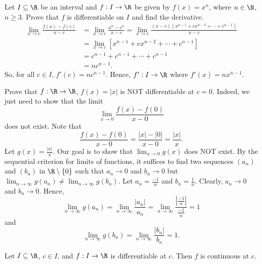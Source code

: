 \begin{eg}
    Let \( I \subseteq  \R  \) be an interval and \( f: I \to \R  \) be given by \( f(x) = x^{n} \), where \( n \in \N  \), \( n \geq 3  \). Prove that \( f  \) is differentiable on \( I  \) and find the derivative.   
    \begin{align*}
        \lim_{ x \to c  }  \frac{ f(x) - f(c) }{ x - c  }  &= \lim_{ x \to c  }  \frac{ x^{n} - c^{n}  }{  x - c  }  = \lim_{ x \to c  }  \frac{ (x - c ) (x^{n-1} + c x^{n-2 } + \cdots + c^{n-1}) }{  x  -c  }  \\
                                                           &= \lim_{ x \to c  }  [x^{n-1} + c x^{n-2 } + \cdots  + c^{n-1} ] \\
                                                           &= c^{n-1 } + c^{n-1} + \cdots + c^{n-1} \\
                                                           &= n c^{n-1}.
    \end{align*}
    So, for all \( c \in I  \), \( f'(c) = n c^{n-1} \). Hence, \( f': I \to \R  \) where \( f'(x) = n x^{n-1 } \).
\end{eg}

\begin{eg}
Prove that \( f: \R \to \R  \), \( f(x) = | x  |  \) is NOT differentiable at \( c = 0  \). Indeed, we just need to show that the limit
\[  \lim_{ x \to 0  }  \frac{ f(x) - f(0) }{ x - 0  }   \]
does not exist. Note that 
\[  \frac{ f(x) - f(0) }{ x - 0 }  = \frac{ | x  |  - | 0  |  }{ x - 0  } = \frac{ | x  |  }{ x  }. \]
Let \( g(x) = \frac{ | x  |  }{ x  }  \). Our goal is to show that \( \lim_{ x \to 0  } g(x) \) does NOT exist. By the sequential criterion for limits of functions, it suffices to find two sequences \( ({a}_{n}) \) and \( ({b}_{n}) \) in \( \R \setminus  \{  0  \}  \) such that \( {a}_{n} \to 0  \) and \( {b}_{n} \to 0  \) but \( \lim_{ n \to \infty  }  g({a}_{n}) \neq \lim_{ n \to \infty  }  g({b}_{n}) \). Let \( {a}_{n}= \frac{ -1  }{ n }  \) and \( {b}_{n} = \frac{ 1 }{ n }  \). Clearly, \( {a}_{n} \to 0  \) and \( {b}_{n} \to 0  \). Hence, 
\[  \lim_{ n \to \infty  }  g({a}_{n}) = \lim_{ n \to \infty  }  \frac{ | {a}_{n} |  }{ {a}_{n} }  = \lim_{ n \to \infty  }  \frac{ | \frac{ -1 }{ n }  |  }{ \frac{ -1 }{ n }  } = 1  \]
and
\[  \lim_{ n \to \infty  }  g({b}_{n}) = \lim_{ n \to \infty  }  \frac{ | {b}_{n} |   }{ {b}_{n}  } = 1.  \]
\end{eg}


\begin{theorem}
    Let \( I \subseteq  \R  \), \( c \in I  \), and \( f: I \to \R  \) is differentiable at \( c  \). Then \( f \) is continuous at \( c  \).
\end{theorem}

